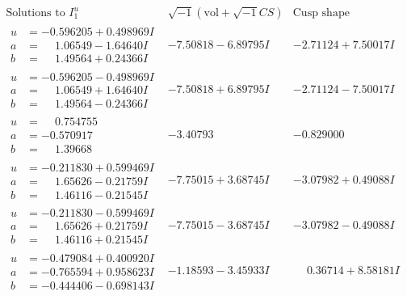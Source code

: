 \documentclass[1p]{elsarticle_modified}
\theoremstyle{definition}
\newcommand{\I}{\sqrt{-1}}
\begin{document}
$$\begin{array}{c|c|c}  
\text{Solutions to }I^u_{1}& \I (\text{vol} + \sqrt{-1}CS) & \text{Cusp shape}\\
 \hline 
\begin{aligned}
u &= -0.596205 + 0.498969 I \\
a &= \phantom{-}1.06549 - 1.64640 I \\
b &= \phantom{-}1.49564 + 0.24366 I\end{aligned}
 & -7.50818 - 6.89795 I & -2.71124 + 7.50017 I \\ \hline\begin{aligned}
u &= -0.596205 - 0.498969 I \\
a &= \phantom{-}1.06549 + 1.64640 I \\
b &= \phantom{-}1.49564 - 0.24366 I\end{aligned}
 & -7.50818 + 6.89795 I & -2.71124 - 7.50017 I \\ \hline\begin{aligned}
u &= \phantom{-}0.754755\phantom{ +0.000000I} \\
a &= -0.570917\phantom{ +0.000000I} \\
b &= \phantom{-}1.39668\phantom{ +0.000000I}\end{aligned}
 & -3.40793\phantom{ +0.000000I} & -0.829000\phantom{ +0.000000I} \\ \hline\begin{aligned}
u &= -0.211830 + 0.599469 I \\
a &= \phantom{-}1.65626 - 0.21759 I \\
b &= \phantom{-}1.46116 - 0.21545 I\end{aligned}
 & -7.75015 + 3.68745 I & -3.07982 + 0.49088 I \\ \hline\begin{aligned}
u &= -0.211830 - 0.599469 I \\
a &= \phantom{-}1.65626 + 0.21759 I \\
b &= \phantom{-}1.46116 + 0.21545 I\end{aligned}
 & -7.75015 - 3.68745 I & -3.07982 - 0.49088 I \\ \hline\begin{aligned}
u &= -0.479084 + 0.400920 I \\
a &= -0.765594 + 0.958623 I \\
b &= -0.444406 - 0.698143 I\end{aligned}
 & -1.18593 - 3.45933 I & \phantom{-}0.36714 + 8.58181 I \\ \hline\begin{aligned}

\end{aligned}
\end{array}$$
\end{document}
